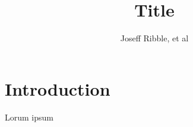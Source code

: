 \documentclass[
	12pt,
	letterpaper,
]{report}
\title{Title}
\author{Joseff Ribble, et al}
\begin{document}
\maketitle

\section{Introduction}
Lorum ipsum
\end{document}
